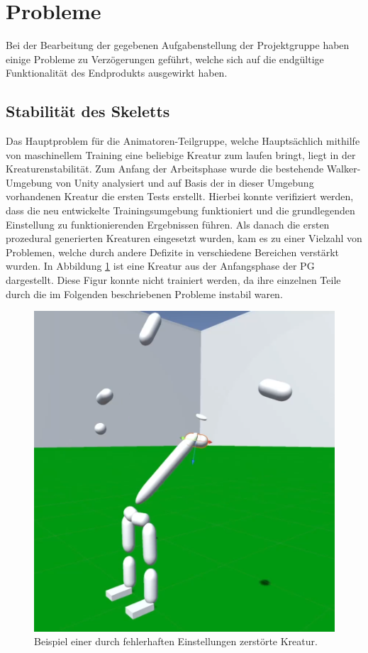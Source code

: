 \section{Probleme}
Bei der Bearbeitung der gegebenen Aufgabenstellung der Projektgruppe haben einige Probleme zu Verzögerungen geführt, welche sich auf die endgültige Funktionalität des Endprodukts ausgewirkt haben.

\subsection{Stabilität des Skeletts}
Das Hauptproblem für die Animatoren-Teilgruppe, welche Hauptsächlich mithilfe von maschinellem Training eine beliebige Kreatur zum laufen bringt, liegt in der Kreaturenstabilität. Zum Anfang der Arbeitsphase wurde die bestehende Walker-Umgebung von Unity analysiert und auf Basis der in dieser Umgebung vorhandenen Kreatur die ersten Tests erstellt. Hierbei konnte verifiziert werden, dass die neu entwickelte Trainingsumgebung funktioniert und die grundlegenden Einstellung zu funktionierenden Ergebnissen führen. Als danach die ersten prozedural generierten Kreaturen eingesetzt wurden, kam es zu einer Vielzahl von Problemen, welche durch andere Defizite in verschiedene Bereichen verstärkt wurden. In Abbildung \ref{fig:explodierendeKreatur} ist eine Kreatur aus der Anfangsphase der PG dargestellt. Diese Figur konnte nicht trainiert werden, da ihre einzelnen Teile durch die im Folgenden beschriebenen Probleme instabil waren.

\begin{figure}
	\centering
	\includegraphics[width=0.5\linewidth]{resources/img/Discord_XmWjop66BU}
	\caption[Beispiel explodierende Kreatur]{Beispiel einer durch fehlerhaften Einstellungen zerstörte Kreatur.}
	\label{fig:explodierendeKreatur}
\end{figure}

